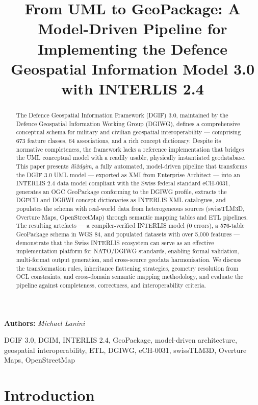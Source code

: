 \documentclass[conference]{IEEEtran}
\title{From UML to GeoPackage: A Model-Driven Pipeline for Implementing the Defence Geospatial Information Model 3.0 with INTERLIS 2.4}
\author{\IEEEauthorblockN{Michael Lanini}}
\begin{document}
\maketitle
\onecolumn

\textbf{Authors:} \textit{Michael Lanini}


\begin{abstract}
The Defence Geospatial Information Framework (DGIF) 3.0, maintained by the Defence Geospatial Information Working Group (DGIWG), defines a comprehensive conceptual schema for military and civilian geospatial interoperability — comprising 673 feature classes, 64 associations, and a rich concept dictionary. Despite its normative completeness, the framework lacks a reference implementation that bridges the UML conceptual model with a readily usable, physically instantiated geodatabase. This paper presents \textit{ili2dgim}, a fully automated, model-driven pipeline that transforms the DGIF 3.0 UML model — exported as XMI from Enterprise Architect — into an INTERLIS 2.4 data model compliant with the Swiss federal standard eCH-0031, generates an OGC GeoPackage conforming to the DGIWG profile, extracts the DGFCD and DGRWI concept dictionaries as INTERLIS XML catalogues, and populates the schema with real-world data from heterogeneous sources (swissTLM3D, Overture Maps, OpenStreetMap) through semantic mapping tables and ETL pipelines. The resulting artefacts — a compiler-verified INTERLIS model (0 errors), a 576-table GeoPackage schema in WGS 84, and populated datasets with over 5,000 features — demonstrate that the Swiss INTERLIS ecosystem can serve as an effective implementation platform for NATO/DGIWG standards, enabling formal validation, multi-format output generation, and cross-source geodata harmonisation. We discuss the transformation rules, inheritance flattening strategies, geometry resolution from OCL constraints, and cross-domain semantic mapping methodology, and evaluate the pipeline against completeness, correctness, and interoperability criteria.
\end{abstract}

\begin{IEEEkeywords}
DGIF 3.0, DGIM, INTERLIS 2.4, GeoPackage, model-driven architecture, geospatial interoperability, ETL, DGIWG, eCH-0031, swissTLM3D, Overture Maps, OpenStreetMap
\end{IEEEkeywords}



\section{Introduction}
\end{document}
